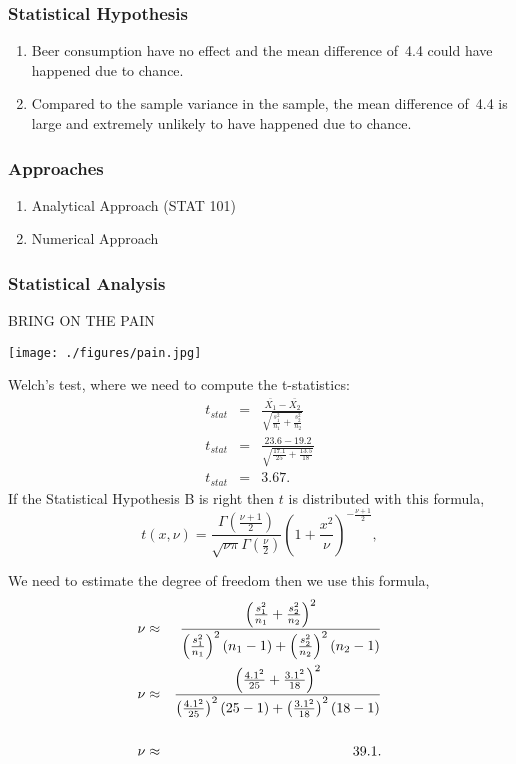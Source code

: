 \begin{frame}
\frametitle{Statistical Hypothesis}
\begin{enumerate}[<+->][A.]
  \item Beer consumption have no effect and the mean difference of~4.4 could have happened due to chance.
  \vspace{1.5cm}
  \item Compared to the sample variance in the sample, the mean difference of~4.4 is large and extremely unlikely to have happened due to  chance.
\end{enumerate}
\end{frame}

\begin{frame}
\frametitle{Approaches}
\begin{enumerate}[<+->]
  \item Analytical Approach (STAT 101)
  \vspace{2cm}
  \item Numerical  Approach
\end{enumerate}
\end{frame}

\begin{frame}
\frametitle{Statistical Analysis}
\centerline{BRING ON THE PAIN }
\centerline{\texttt{[image: ./figures/pain.jpg]}}
\end{frame}

\begin{frame}
Welch's test, where we need to compute the t-statistics:
\begin{eqnarray*}
t_{stat} &=& \frac{\bar{X_1}-\bar{X_2}}{\sqrt{\frac{{s^2_1}}{n_1} +\frac{{s^2_2}}{n_2}}} \\
t_{stat} &=& \frac{23.6-19.2}{\sqrt{\frac{17.1}{25} +\frac{{13.5}}{18}}} \\
t_{stat} &=& 3.67.
\end{eqnarray*}
If the Statistical Hypothesis B is right then $t$ is distributed with this formula,
\begin{equation*}
  t(x,\nu) = \frac{\Gamma(\frac{\nu+1}{2})}{\sqrt{\nu\pi}\Gamma(\frac{\nu}{2})}\left(1 +\frac{x^2}{\nu} \right)^{-\frac{\nu+1}{2}},
\end{equation*}
\end{frame}

\begin{frame}
We need to estimate the degree of freedom then we use this formula,
\begin{eqnarray*}
\nu &\approx& \large \frac{\left(\frac{{s^2_1}}{n_1} +\frac{{s^2_2}}{n_2}\right)^2}{\left(\frac{s^2_1}{n_1}\right)^2\left(n_1 -1\right) + \left(\frac{{s^2_2}}{n_2}\right)^2\left(n_2 -1\right)}\\
\nu &\approx& \large \frac{\left(\frac{{4.1^2}}{25} +\frac{{3.1^2}}{18}\right)^2}{\left(\frac{4.1^2}{25}\right)^2\left(25 -1\right) + \left(\frac{{3.1^2}}{18}\right)^2\left(18 -1\right)}\\
~\\
\nu &\approx& 39.1.
\end{eqnarray*}
\end{frame}

